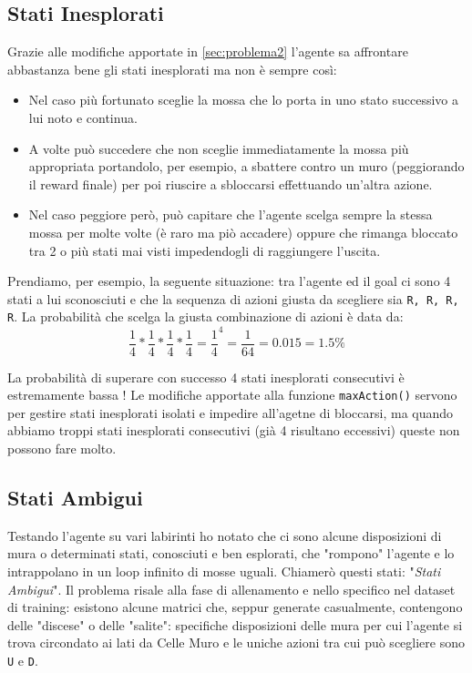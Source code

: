 \subsection{Stati Inesplorati}
Grazie alle modifiche apportate in \autoref{sec:problema2} l'agente sa affrontare abbastanza bene gli stati inesplorati ma non \`{e} sempre cos\`{i}:

\begin{itemize}
	\item Nel caso pi\`{u} fortunato sceglie la mossa che lo porta in uno stato successivo a lui noto e continua.
	\item A volte pu\`{o} succedere che non sceglie immediatamente la mossa pi\`{u} appropriata portandolo, per esempio, a sbattere contro un muro (peggiorando il  reward finale) per poi riuscire a sbloccarsi effettuando un'altra azione.
	\item Nel caso peggiore per\`{o}, pu\`{o} capitare che l'agente scelga sempre la stessa mossa per molte volte (\`{e} raro ma pi\`{o} accadere) oppure che rimanga bloccato tra 2 o pi\`{u} stati mai visti impedendogli di raggiungere l'uscita.
\end{itemize}

Prendiamo, per esempio, la seguente situazione: tra l'agente ed il goal ci sono 4 stati a lui sconosciuti e che la sequenza di azioni giusta da scegliere sia \lstinline[style=cmd]|R, R, R, R|. La probabilit\`{a} che scelga la giusta combinazione di azioni \`{e} data da:
\[\frac{1}{4} * \frac{1}{4} * \frac{1}{4} * \frac{1}{4} = {\frac{1}{4}}^4 = \frac{1}{64} = 0.015 = 1.5\%\]

La probabilit\`{a} di superare con successo 4 stati inesplorati consecutivi \`{e} estremamente bassa ! Le modifiche apportate alla funzione \lstinline[style=cmd]|maxAction()| servono per gestire stati inesplorati isolati e impedire all'agetne di bloccarsi, ma quando abbiamo troppi stati inesplorati consecutivi (gi\`{a} 4 risultano eccessivi)  queste non possono fare molto.

\subsection{Stati Ambigui}

Testando l'agente su vari labirinti ho notato che ci sono alcune disposizioni di mura o determinati stati, conosciuti e ben esplorati, che "rompono" l'agente e lo intrappolano in un loop infinito di mosse uguali. Chiamer\`{o} questi stati: "\textit{Stati Ambigui}". Il problema risale alla fase di allenamento e nello specifico nel dataset di training: esistono alcune matrici che, seppur generate casualmente, contengono delle "discese" o delle "salite": specifiche disposizioni delle mura per cui l'agente si trova circondato ai lati da Celle Muro e le uniche azioni tra cui pu\`{o} scegliere sono \lstinline[style=cmd]|U| e \lstinline[style=cmd]|D|. 

